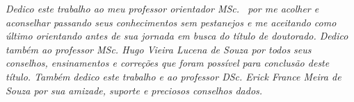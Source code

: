 \begin{dedicatoria}
	\vspace*{\fill}
		\centering
		\noindent
		\textit{ 
			Dedico este trabalho ao meu professor orientador MSc. \imprimirorientador\ por me acolher e aconselhar passando seus conhecimentos sem pestanejos e me aceitando como último orientando antes de sua jornada em busca do título de doutorado. Dedico também ao professor MSc. Hugo Vieira Lucena de Souza por todos seus conselhos, ensinamentos e correções que foram possível para conclusão deste título. Também dedico este trabalho e ao professor DSc. Erick France Meira de Souza por sua amizade, suporte e preciosos conselhos dados.
		} \vspace*{\fill}
\end{dedicatoria}
